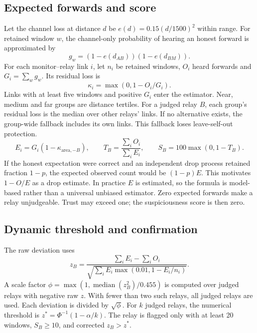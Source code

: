 \documentclass{article}
\begin{document}
\subsection{Expected forwards and score}
Let the channel loss at distance $d$ be $e(d)=0.15(d/1500)^2$ within range. For retained window $w$, the channel-only probability of hearing an honest forward is approximated by
\begin{equation}g_w=(1-e(d_{AB}))(1-e(d_{BM})).\end{equation}
For each monitor--relay link $i$, let $n_i$ be retained windows, $O_i$ heard forwards and $G_i=\sum_w g_w$. Its residual loss is
\begin{equation}\kappa_i=\max(0,1-O_i/G_i).\end{equation}
Links with at least five windows and positive $G_i$ enter the estimator. Near, medium and far groups are distance tertiles. For a judged relay $B$, each group's residual loss is the median over other relays' links. If no alternative exists, the group-wide fallback includes its own links. This fallback loses leave-self-out protection.
\begin{equation}
E_i=G_i(1-\kappa_{\mathrm{area},-B}),\qquad
T_B=\frac{\sum_i O_i}{\sum_i E_i},\qquad
S_B=100\max(0,1-T_B).
\end{equation}
If the honest expectation were correct and an independent drop process retained fraction $1-p$, the expected observed count would be $(1-p)E$. This motivates $1-O/E$ as a drop estimate. In practice $E$ is estimated, so the formula is model-based rather than a universal unbiased estimator. Zero expected forwards make a relay unjudgeable. Trust may exceed one; the suspiciousness score is then zero.

\subsection{Dynamic threshold and confirmation}
The raw deviation uses
\begin{equation}
z_B=\frac{\sum_i E_i-\sum_i O_i}{\sqrt{\sum_i E_i\max(0.01,1-E_i/n_i)}}.
\end{equation}
A scale factor $\phi=\max(1,\operatorname{median}(z_B^2)/0.455)$ is computed over judged relays with negative raw $z$. With fewer than two such relays, all judged relays are used. Each deviation is divided by $\sqrt\phi$. For $k$ judged relays, the numerical threshold is $z^*=\Phi^{-1}(1-\alpha/k)$. The relay is flagged only with at least 20 windows, $S_B\geq10$, and corrected $z_B>z^*$.
\end{document}
